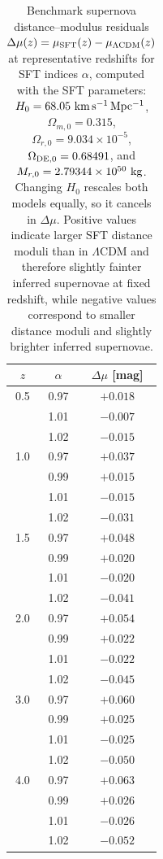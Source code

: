 \documentclass[12pt]{article}
\begin{document}
\begin{table}[H]
\centering
\small
\setlength{\tabcolsep}{5pt}
\renewcommand{\arraystretch}{1.15}
\caption{
Benchmark supernova distance--modulus residuals 
$\Delta\mu(z)=\mu_{\rm SFT}(z)-\mu_{\Lambda{\rm CDM}}(z)$ 
at representative redshifts for SFT indices $\alpha$,
computed with the SFT parameters:
$H_0=68.05~{\rm km\,s^{-1}\,Mpc^{-1}}$, 
$\Omega_{m,0}=0.315$, 
$\Omega_{r,0}=9.034\times10^{-5}$, 
$\Omega_{\rm DE,0}=0.68491$,
and $M_{r,0}=2.79344\times10^{50}\ {\rm kg}$.
Changing $H_0$ rescales both models equally, so it cancels in $\Delta\mu$.
Positive values indicate larger SFT distance moduli than in
$\Lambda$CDM and therefore slightly fainter inferred supernovae at fixed
redshift, while negative values correspond to smaller distance moduli
and slightly brighter inferred supernovae.
}
\label{tab:SN_residuals}
\begin{tabular}{c c c}
\toprule
$z$ & $\alpha$ & $\Delta\mu$ [mag] \\
\midrule
0.5 & 0.97 & $+0.018$ \\
    & 1.01 & $-0.007$ \\
    & 1.02 & $-0.015$ \\
\hline
1.0 & 0.97 & $+0.037$ \\
    & 0.99 & $+0.015$ \\
    & 1.01 & $-0.015$ \\
    & 1.02 & $-0.031$ \\
\hline
1.5 & 0.97 & $+0.048$ \\
    & 0.99 & $+0.020$ \\
    & 1.01 & $-0.020$ \\
    & 1.02 & $-0.041$ \\
\hline
2.0 & 0.97 & $+0.054$ \\
    & 0.99 & $+0.022$ \\
    & 1.01 & $-0.022$ \\
    & 1.02 & $-0.045$ \\
\hline
3.0 & 0.97 & $+0.060$ \\
    & 0.99 & $+0.025$ \\
    & 1.01 & $-0.025$ \\
    & 1.02 & $-0.050$ \\
\hline
4.0 & 0.97 & $+0.063$ \\
    & 0.99 & $+0.026$ \\
    & 1.01 & $-0.026$ \\
    & 1.02 & $-0.052$ \\
\bottomrule
\end{tabular}
\end{table}
\end{document}
